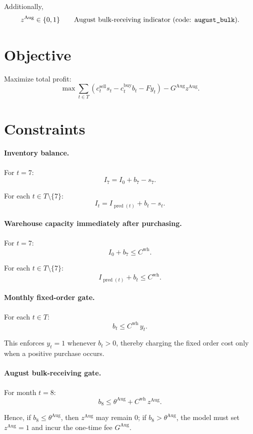 Additionally,
\[
z^{\text{Aug}} \in \{0,1\}
\qquad
\text{August bulk-receiving indicator (code: \texttt{august\_bulk}).}
\]

\section*{Objective}

Maximize total profit:
\[
\max \sum_{t\in T}\left(c_t^{\text{sell}} s_t - c_t^{\text{buy}} b_t - F y_t\right) - G^{\text{Aug}} z^{\text{Aug}}.
\]

\section*{Constraints}

\paragraph{Inventory balance.}
For \(t=7\):
\[
I_7 = I_0 + b_7 - s_7.
\]

For each \(t\in T\setminus\{7\}\):
\[
I_t = I_{\operatorname{pred}(t)} + b_t - s_t.
\]

\paragraph{Warehouse capacity immediately after purchasing.}
For \(t=7\):
\[
I_0 + b_7 \le C^{\text{wh}}.
\]

For each \(t\in T\setminus\{7\}\):
\[
I_{\operatorname{pred}(t)} + b_t \le C^{\text{wh}}.
\]

\paragraph{Monthly fixed-order gate.}
For each \(t\in T\):
\[
b_t \le C^{\text{wh}}\, y_t.
\]

This enforces \(y_t=1\) whenever \(b_t>0\), thereby charging the fixed order cost only when a positive purchase occurs.

\paragraph{August bulk-receiving gate.}
For month \(t=8\):
\[
b_8 \le \theta^{\text{Aug}} + C^{\text{wh}}\, z^{\text{Aug}}.
\]

Hence, if \(b_8 \le \theta^{\text{Aug}}\), then \(z^{\text{Aug}}\) may remain \(0\); if \(b_8 > \theta^{\text{Aug}}\), the model must set \(z^{\text{Aug}}=1\) and incur the one-time fee \(G^{\text{Aug}}\).

